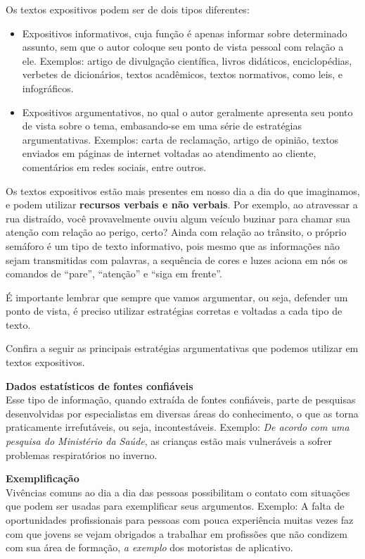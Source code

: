 Os textos expositivos podem ser de dois tipos diferentes:

\begin{itemize}
\item
  Expositivos informativos, cuja função é apenas informar sobre
  determinado assunto, sem que o autor coloque seu ponto de vista
  pessoal com relação a ele. Exemplos: artigo de divulgação científica,
  livros didáticos, enciclopédias, verbetes de dicionários, textos
  acadêmicos, textos normativos, como leis, e infográficos.
\item
  Expositivos argumentativos, no qual o autor geralmente apresenta seu
  ponto de vista sobre o tema, embasando-se em uma série de estratégias
  argumentativas. Exemplos: carta de reclamação, artigo de opinião,
  textos enviados em páginas de internet voltadas ao atendimento ao
  cliente, comentários em redes sociais, entre outros.
\end{itemize}

Os textos expositivos estão mais presentes em nosso dia a dia do que
imaginamos, e podem utilizar \textbf{recursos verbais e não verbais}.
Por exemplo, ao atravessar a rua distraído, você provavelmente ouviu
algum veículo buzinar para chamar sua atenção com relação ao perigo,
certo? Ainda com relação ao trânsito, o próprio semáforo é um tipo de
texto informativo, pois mesmo que as informações não sejam transmitidas
com palavras, a sequência de cores e luzes aciona em nós os comandos de
``pare'', ``atenção'' e ``siga em frente''.

É importante lembrar que sempre que vamos argumentar, ou seja, defender
um ponto de vista, é preciso utilizar estratégias corretas e voltadas a
cada tipo de texto.

Confira a seguir as principais estratégias argumentativas que podemos
utilizar em textos expositivos.

\textbf{Dados estatísticos de fontes confiáveis}\\
Esse tipo de informação, quando extraída de fontes confiáveis, parte de
pesquisas desenvolvidas por especialistas em diversas áreas do
conhecimento, o que as torna praticamente irrefutáveis, ou seja,
incontestáveis. Exemplo: \emph{De acordo com uma pesquisa do Ministério
da Saúde}, as crianças estão mais vulneráveis a sofrer problemas
respiratórios no inverno.

\textbf{Exemplificação}\\
Vivências comuns ao dia a dia das pessoas possibilitam o contato com
situações que podem ser usadas para exemplificar seus argumentos.
Exemplo: A falta de oportunidades profissionais para pessoas com pouca
experiência muitas vezes faz com que jovens se vejam obrigados a
trabalhar em profissões que não condizem com sua área de formação,
\emph{a exemplo} dos motoristas de aplicativo.

